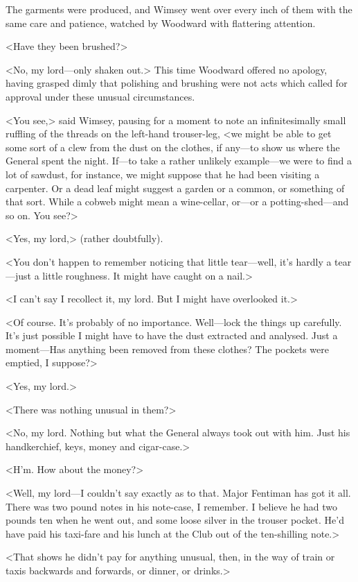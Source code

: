 The garments were produced, and Wimsey went over every inch of them with the same care and patience, watched by Woodward with flattering attention.

<Have they been brushed?>

<No, my lord—only shaken out.> This time Woodward offered no apology, having grasped dimly that polishing and brushing were not acts which called for approval under these unusual circumstances.

<You see,> said Wimsey, pausing for a moment to note an infinitesimally small ruffling of the threads on the left-hand trouser-leg, <we might be able to get some sort of a clew from the dust on the clothes, if any—to show us where the General spent the night. If—to take a rather unlikely example—we were to find a lot of sawdust, for instance, we might suppose that he had been visiting a carpenter. Or a dead leaf might suggest a garden or a common, or something of that sort. While a cobweb might mean a wine-cellar, or—or a potting-shed—and so on. You see?>

<Yes, my lord,> (rather doubtfully).

<You don't happen to remember noticing that little tear—well, it's hardly a tear—just a little roughness. It might have caught on a nail.>

<I can't say I recollect it, my lord. But I might have overlooked it.>

<Of course. It's probably of no importance. Well—lock the things up carefully. It's just possible I might have to have the dust extracted and analysed. Just a moment—Has anything been removed from these clothes? The pockets were emptied, I suppose?>

<Yes, my lord.>

<There was nothing unusual in them?>

<No, my lord. Nothing but what the General always took out with him. Just his handkerchief, keys, money and cigar-case.>

<H'm. How about the money?>

<Well, my lord—I couldn't say exactly as to that. Major Fentiman has got it all. There was two pound notes in his note-case, I remember. I believe he had two pounds ten when he went out, and some loose silver in the trouser pocket. He'd have paid his taxi-fare and his lunch at the Club out of the ten-shilling note.>

<That shows he didn't pay for anything unusual, then, in the way of train or taxis backwards and forwards, or dinner, or drinks.>

